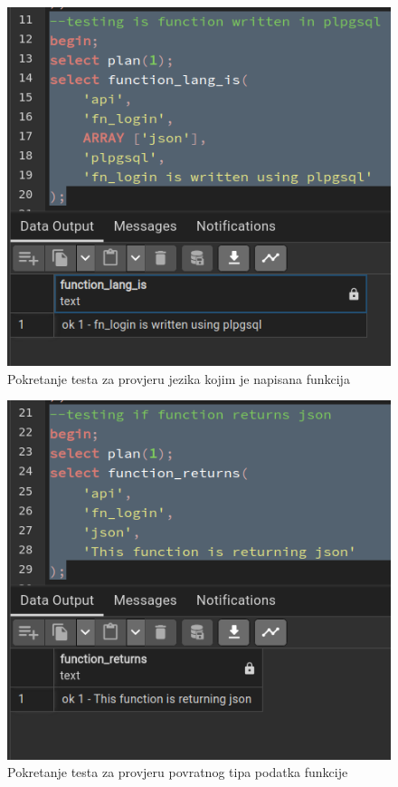 				\begin{figure}[H]
					\centering
					\includegraphics[width=\textwidth]{slike/unit_tests/ut_1/func_lang.png}
					\caption{Pokretanje testa za provjeru jezika kojim je napisana funkcija}
					\label{fig: IS1-function_lang}
				\end{figure}
				\begin{figure}[H]
					\centering
					\includegraphics[width=\textwidth]{slike/unit_tests/ut_1/func_return.png}
					\caption{Pokretanje testa za provjeru povratnog tipa podatka funkcije}
					\label{fig: IS1-function_return}
				\end{figure}

